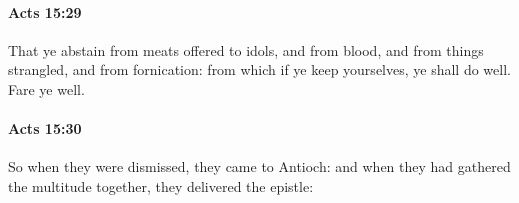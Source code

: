 		\paragraph{Acts 15:29} %
			\label{ACTS-15-29}

			That ye abstain from meats offered to idols, and from blood, and from things strangled, and from fornication: from which if ye keep yourselves, ye shall do well.  Fare ye well.

			\begin{framed}
			\scriptsize
				\begin{compactdesc}
					\item[SBLG] 
				\end{compactdesc}
			\end{framed}

		\paragraph{Acts 15:30} %
			\label{ACTS-15-30}

			So when they were dismissed, they came to Antioch: and when they had gathered the multitude together, they delivered the epistle:

